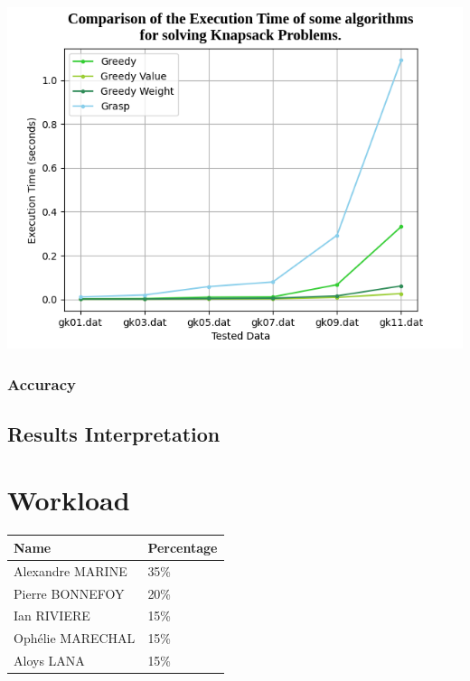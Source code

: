 \documentclass[a4paper, 11pt]{article}
\begin{document}
\begin{center}
    \includegraphics[scale = 0.5]{graph_multi_gk_greed.png}


    \subsubsection{Accuracy}

    \subsection{Results Interpretation}
       

\section{Workload}
\begin{center}
    \begin{tabular}{|p{2cm}|p{2cm}|}
        \hline
        \textbf{Name} & \textbf{Percentage} \\
        \hline
        \hline
        Alexandre MARINE &  35\% \\
        \hline 
        Pierre BONNEFOY &  20\% \\
        \hline
        Ian RIVIERE & 15\% \\
        \hline
        Ophélie MARECHAL &  15\% \\
        \hline 
        Aloys LANA &  15\% \\
        \hline
    \end{tabular}
\end{center}


\end{center}
\end{document}
